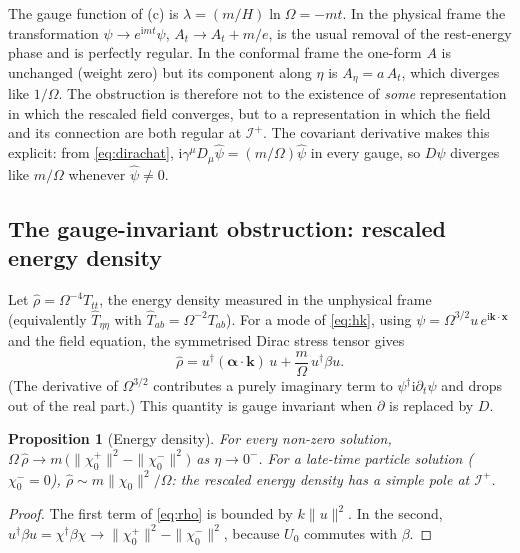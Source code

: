 \documentclass[11pt,a4paper]{article}
\newtheorem{proposition}{Proposition}
\theoremstyle{definition}
\newcommand{\scri}{\mathscr{I}^{+}}
\newcommand{\ii}{\mathrm{i}}
\newcommand{\hpsi}{\hat\psi}
\begin{document}
The gauge function of (c) is $\lambda=(m/H)\ln\Omega=-mt$. In the physical frame the transformation $\psi\to e^{\ii mt}\psi$, $A_{t}\to A_{t}+m/e$, is the usual removal of the rest-energy phase and is perfectly regular. In the conformal frame the one-form $A$ is unchanged (weight zero) but its component along $\eta$ is $A_{\eta}=a\,A_{t}$, which diverges like $1/\Omega$. The obstruction is therefore not to the existence of \emph{some} representation in which the rescaled field converges, but to a representation in which the field and its connection are both regular at $\scri$. The covariant derivative makes this explicit: from \eqref{eq:dirachat}, $\ii\gamma^{\mu}D_{\mu}\hpsi=(m/\Omega)\hpsi$ in every gauge, so $D\hpsi$ diverges like $m/\Omega$ whenever $\hpsi\neq0$.

\subsection{The gauge-invariant obstruction: rescaled energy density}
\label{sec:energy}

Let $\hat\rho=\Omega^{-4}T_{tt}$, the energy density measured in the unphysical frame (equivalently $\hat T_{\eta\eta}$ with $\hat T_{ab}=\Omega^{-2}T_{ab}$). For a mode of \eqref{eq:hk}, using $\psi=\Omega^{3/2}u\,e^{\ii\mathbf{k}\cdot\mathbf{x}}$ and the field equation, the symmetrised Dirac stress tensor gives
\begin{equation}
\hat\rho=u^{\dagger}(\boldsymbol\alpha\cdot\mathbf{k})\,u+\frac{m}{\Omega}\,u^{\dagger}\beta u .
\label{eq:rho}
\end{equation}
(The derivative of $\Omega^{3/2}$ contributes a purely imaginary term to $\psi^{\dagger}\ii\partial_{t}\psi$ and drops out of the real part.) This quantity is gauge invariant when $\partial$ is replaced by $D$.

\begin{proposition}[Energy density]
\label{prop:energy}
For every non-zero solution, $\Omega\,\hat\rho\to m\,\big(\|\chi_{0}^{+}\|^{2}-\|\chi_{0}^{-}\|^{2}\big)$ as $\eta\to0^{-}$. For a late-time particle solution ($\chi_{0}^{-}=0$), $\hat\rho\sim m\|\chi_{0}\|^{2}/\Omega$: the rescaled energy density has a simple pole at $\scri$.
\end{proposition}
\begin{proof}
The first term of \eqref{eq:rho} is bounded by $k\|u\|^{2}$. In the second, $u^{\dagger}\beta u=\chi^{\dagger}\beta\chi\to\|\chi_{0}^{+}\|^{2}-\|\chi_{0}^{-}\|^{2}$, because $U_{0}$ commutes with $\beta$.
\end{proof}
\end{document}
